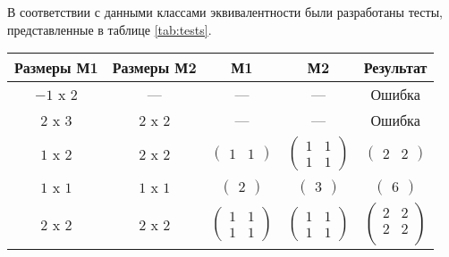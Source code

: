 В соответствии с данными классами эквивалентности были разработаны тесты, представленные в таблице \ref{tab:tests}.

\begin{table}[h!]
	\begin{center}
		\begin{tabular}{|c|c|c|c|c|}
			\hline
			Размеры М1 & Размеры М2 & М1 & М2 & Результат \\ 
            \hline
            $-1$ x $2$ &
            --- &
			--- &
			--- &
			Ошибка \\
            \hline
            $2$ x $3$ &
            $2$ x $2$ &
			--- &
			--- &
            Ошибка \\
            \hline
            $1$ x $2$ &
            $2$ x $2$ &
			$\begin{pmatrix}
                1 & 1
			\end{pmatrix}$ & 
            $\begin{pmatrix}
                1 & 1\\
                1 & 1
			\end{pmatrix}$ & 
            $\begin{pmatrix}
                2 & 2
			\end{pmatrix}$ \\ 
            \hline
            $1$ x $1$ &
            $1$ x $1$ &
			$\begin{pmatrix}
                2
			\end{pmatrix}$ & 
            $\begin{pmatrix}
                3
			\end{pmatrix}$ & 
            $\begin{pmatrix}
               6
			\end{pmatrix}$ \\ 
            \hline
            $2$ x $2$ &
            $2$ x $2$ &
			$\begin{pmatrix}
			1 & 1\\
			1 & 1
			\end{pmatrix}$ &
			$\begin{pmatrix}
			1 & 1\\
			1 & 1
			\end{pmatrix}$ &
			$\begin{pmatrix}
			2 & 2\\
			2 & 2\\
			\end{pmatrix}$\\

\end{tabular}
\end{center}
\end{table}
